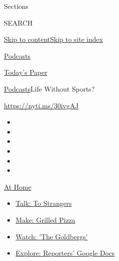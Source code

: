 Sections

SEARCH

\protect\hyperlink{site-content}{Skip to
content}\protect\hyperlink{site-index}{Skip to site index}

\href{https://www.nytimes3xbfgragh.onion/spotlight/podcasts}{Podcasts}

\href{https://myaccount.nytimes3xbfgragh.onion/auth/login?response_type=cookie\&client_id=vi}{}

\href{https://www.nytimes3xbfgragh.onion/section/todayspaper}{Today's
Paper}

\href{/spotlight/podcasts}{Podcasts}\textbar{}Life Without Sports?

\url{https://nyti.ms/30ivgAJ}

\begin{itemize}
\item
\item
\item
\item
\item
\item
\end{itemize}

\href{https://www.nytimes3xbfgragh.onion/spotlight/at-home?action=click\&pgtype=Article\&state=default\&region=TOP_BANNER\&context=at_home_menu}{At
Home}

\begin{itemize}
\tightlist
\item
  \href{https://www.nytimes3xbfgragh.onion/2020/08/03/well/family/the-benefits-of-talking-to-strangers.html?action=click\&pgtype=Article\&state=default\&region=TOP_BANNER\&context=at_home_menu}{Talk:
  To Strangers}
\item
  \href{https://www.nytimes3xbfgragh.onion/2020/08/01/at-home/coronavirus-make-pizza-on-a-grill.html?action=click\&pgtype=Article\&state=default\&region=TOP_BANNER\&context=at_home_menu}{Make:
  Grilled Pizza}
\item
  \href{https://www.nytimes3xbfgragh.onion/2020/07/31/arts/television/goldbergs-abc-stream.html?action=click\&pgtype=Article\&state=default\&region=TOP_BANNER\&context=at_home_menu}{Watch:
  'The Goldbergs'}
\item
  \href{https://www.nytimes3xbfgragh.onion/interactive/2020/at-home/even-more-reporters-editors-diaries-lists-recommendations.html?action=click\&pgtype=Article\&state=default\&region=TOP_BANNER\&context=at_home_menu}{Explore:
  Reporters' Google Docs}
\end{itemize}

